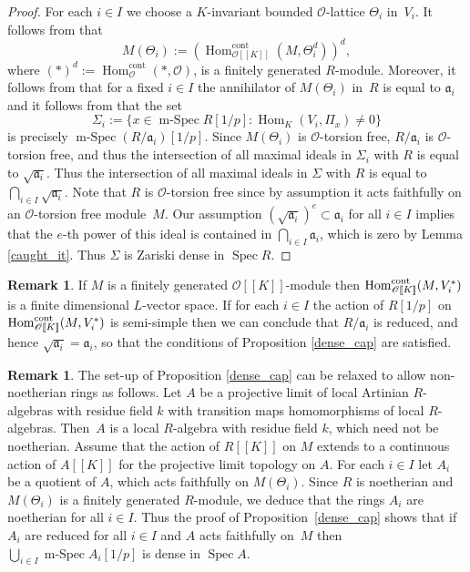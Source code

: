 \documentclass[JEP,XML,SOM,Unicode,NoEqCountersInSection]{cedram}
\let\mathcal\mathscr
\theoremstyle{definition}
\newtheorem{remark}[prop]{Remark}
\DeclareMathOperator{\Hom}{Hom}
\DeclareMathOperator{\Spec}{Spec}
\DeclareMathOperator{\mSpec}{m-Spec}
\newcommand{\br}[1]{[\![#1]\!]}
\newcommand{\cO}{\mathcal{O}}
\newcommand{\cont}{\mathrm{cont}}
\begin{document}
\begin{proof} For each $i\in I$ we choose a $K$-invariant bounded $\cO$-lattice $\Theta_i$ in~$V_i$.
It follows from
\cite[Prop.\,2.15]{duke} that
\[
M(\Theta_i):=(\Hom_{\cO\br{K}}^{\cont}(M, \Theta_i^d))^d,
\]
where
$(\ast)^d:=\Hom_{\cO}^{\cont}(\ast, \cO)$, is a finitely generated $R$-module. Moreover, it follows from
\cite[Eqn.\,(11) and Rem.\,2.18]{duke} that for a fixed $i\in I$ the annihilator of $M(\Theta_i)$ in~$R$ is equal to $\mathfrak a_i$ and it follows from \cite[Prop.\,2.22]{duke} that the set
\[
\Sigma_i:=\{ x\in \mSpec R[1/p]: \Hom_K(V_i, \Pi_x)\neq 0\}
\]
is precisely $\mSpec (R/\mathfrak a_i)[1/p]$. Since $M(\Theta_i)$ is $\cO$-torsion free, $R/\mathfrak a_i$ is $\cO$-torsion free, and thus the intersection of all maximal ideals in $\Sigma_i$ with $R$ is equal to $\sqrt{\mathfrak a_i}$. Thus the intersection of all maximal ideals in $\Sigma$ with $R$ is equal to $\bigcap_{i\in I} \sqrt{\mathfrak a_i}$.
Note that $R$ is $\cO$-torsion free since by assumption it acts faithfully on an $\cO$-torsion free module~$M$.
Our assumption $(\sqrt{\mathfrak a_i})^e \subset \mathfrak a_i$ for all $i\in I$
implies that the $e$-th power of this ideal is contained in $\bigcap_{i\in I} \mathfrak a_i$, which is zero by Lemma \ref{caught_it}. Thus $\Sigma$ is Zariski dense in $\Spec R$.
\end{proof}

\begin{remark}\label{rem:semi-simple}
If $M$ is a finitely generated $\cO\br{K}$-module then $\Hom_{\cO\br{K}}^{\rm cont}(M, V_i^*)$ is a finite dimensional $L$-vector space.
If for each $i\in I$ the action of $R[1/p]$ on $\Hom_{\cO\br{K}}^{\rm cont}(M, V_i^*)$ is semi-simple then we can conclude that $R/\mathfrak a_i$ is reduced, and
hence $\sqrt{\mathfrak a_i}=\mathfrak a_i$, so that the conditions of Proposition \ref{dense_cap} are satisfied.
\end{remark}

\begin{remark}\label{nonnoetherian} The set-up of Proposition \ref{dense_cap} can be relaxed to allow non-noetherian rings as follows.
Let $A$ be a projective limit of local Artinian $R$-algebras with residue field $k$ with transition maps homomorphisms of local $R$-algebras. Then~$A$ is a local
$R$-algebra with residue field $k$, which need not be noetherian. Assume that the action of $R\br{K}$ on
$M$ extends to a continuous action of $A\br{K}$ for the projective limit topology on $A$. For each $i\in I$ let $A_i$ be a quotient of $A$, which acts faithfully on $M(\Theta_i)$.
Since $R$ is noetherian and $M(\Theta_i)$ is a finitely generated $R$-module, we deduce that the rings $A_i$ are noetherian for all $i\in I$.
Thus the proof of \hbox{Proposition}~\ref{dense_cap} shows that if $A_i$ are reduced for all $i\in I$ and $A$ acts faithfully on~$M$ then $\bigcup_{i\in I} \mSpec A_i [1/p]$
is dense in $\Spec A$.
\end{remark}
\end{document}
